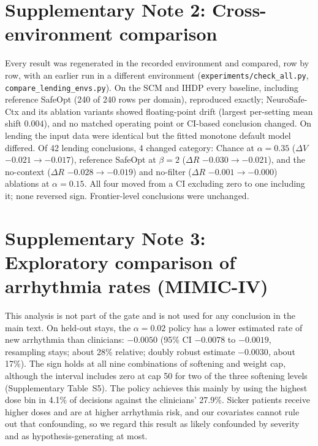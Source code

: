 \documentclass[11pt,a4paper]{article}
\begin{document}
\section*{Supplementary Note 2: Cross-environment comparison}
Every result was regenerated in the recorded environment and compared, row by row, with an earlier run
in a different environment (\texttt{experiments/check\_all.py}, \texttt{compare\_lending\_envs.py}). On
the SCM and IHDP every baseline, including reference SafeOpt (240 of 240 rows per domain), reproduced
exactly; NeuroSafe-Ctx and its ablation variants showed floating-point drift (largest per-setting mean
shift $0.004$), and no matched operating point or CI-based conclusion changed. On lending the input data
were identical but the fitted monotone default model differed. Of 42 lending conclusions, 4 changed
category: Chance at $\alpha=0.35$ ($\Delta V$ $-0.021\to-0.017$), reference SafeOpt at $\beta=2$
($\Delta R$ $-0.030\to-0.021$), and the no-context ($\Delta R$ $-0.028\to-0.019$) and no-filter
($\Delta R$ $-0.001\to-0.000$) ablations at $\alpha=0.15$. All four moved from a CI excluding zero to
one including it; none reversed sign. Frontier-level conclusions were unchanged.

\section*{Supplementary Note 3: Exploratory comparison of arrhythmia rates (MIMIC-IV)}
This analysis is not part of the gate and is not used for any conclusion in the main text. On held-out
stays, the $\alpha=0.02$ policy has a lower estimated rate of new arrhythmia than clinicians: $-0.0050$
(95\% CI $-0.0078$ to $-0.0019$, resampling stays; about 28\% relative; doubly robust estimate $-0.0030$,
about 17\%). The sign holds at all nine combinations of softening and weight cap, although the interval
includes zero at cap 50 for two of the three softening levels (Supplementary Table~S5). The policy
achieves this mainly by using the highest dose bin in 4.1\% of decisions against the clinicians'
27.9\%. Sicker patients receive higher doses and are at higher arrhythmia risk, and our covariates
cannot rule out that confounding, so we regard this result as likely confounded by severity and as
hypothesis-generating at most.

\begin{table}[h]
\caption{\textbf{Paired tests at operating points matched on tuning seeds, nonstationary SCM} (50
held-out seeds). Bold: 95\% bootstrap CI excludes zero. Chance's frontier is flat for
$\alpha\le0.05$, so its first two rows coincide.}
\centering\small
\resizebox{\linewidth}{!}{}
\end{table}
\end{document}
